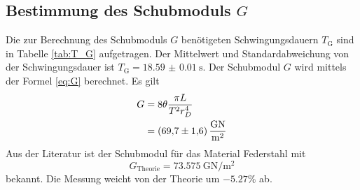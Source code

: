 \subsection{Bestimmung des Schubmoduls \texorpdfstring{$G$}{G}}

Die zur Berechnung des Schubmoduls $G$ benötigeten Schwingungsdauern $T_\text{G}$ sind in Tabelle \ref{tab:T_G} aufgetragen.
Der Mittelwert und Standardabweichung von der Schwingungsdauer ist $T_\text{G}=\SI{18.59(1)}{\second}$.
Der Schubmodul $G$ wird mittels der Formel \eqref{eq:G} berechnet.
Es gilt
\begin{align}
	G 	&=  8 \theta\frac{\pi L}{T^2 r_D^4}\\%
		&=	\SI{69.7\pm1.6}{\giga\newton\per\meter\squared}
	\label{eq:schubmodul}
	\end{align}
Aus der Literatur ist der Schubmodul für das Material Federstahl mit
\begin{equation}
	G_\text{Theorie} = \SI{73.575}{\giga\newton\per\meter\squared}
\end{equation}bekannt.
Die Messung weicht von der Theorie um $-5.27\%$ ab.
